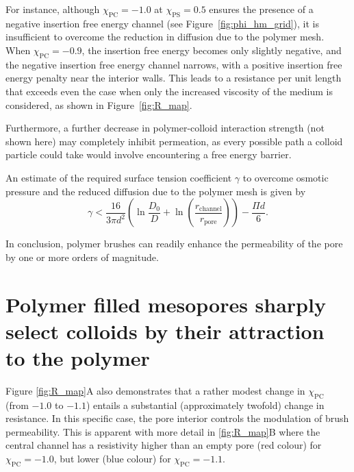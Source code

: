 \documentclass[12pt, a4paper]{article}
\begin{document}
For instance, although $\chi_{\textrm{PC}} = -1.0$ at $\chi_{\textrm{PS}} = 0.5$ ensures the presence of a negative insertion free energy channel (see Figure~\ref{fig:phi_hm_grid}), it is insufficient to overcome the reduction in diffusion due to the polymer mesh. 
When $\chi_{\textrm{PC}} = -0.9$, the insertion free energy becomes only slightly negative, and the negative insertion free energy channel narrows, with a positive insertion free energy penalty near the interior walls. 
This leads to a resistance per unit length that exceeds even the case when only the increased viscosity of the medium is considered, as shown in Figure~\ref{fig:R_map}.

Furthermore, a further decrease in polymer-colloid interaction strength (not shown here) may completely inhibit permeation, as every possible path a colloid particle could take would involve encountering a free energy barrier.

An estimate of the required surface tension coefficient $\gamma$ to overcome osmotic pressure and the reduced diffusion due to the polymer mesh is given by
\begin{equation}
\gamma < \frac{16}{3 \pi d^2} \left( \ln\frac{D_0}{D} + \ln\left( \frac{r_{\textrm{channel}}}{r_{\textrm{pore}}} \right) \right) - \frac{\Pi d}{6}.
\end{equation}

In conclusion, polymer brushes can readily enhance the permeability of the pore by one or more orders of magnitude.

\section{Polymer filled mesopores sharply select colloids by their attraction to the polymer}

Figure \ref{fig:R_map}A also demonstrates that a rather modest change in $\chi_{\text{PC}}$ (from $-1.0$ to $-1.1$) entails a substantial (approximately twofold) change in resistance. 
In this specific case, the pore interior controls the modulation of brush permeability. 
This is apparent with more detail in \ref{fig:R_map}B where the central channel has a resistivity higher than an empty pore (red colour) for $\chi_{\text{PC}}=-1.0$, 
but lower (blue colour) for $\chi_{\text{PC}}=-1.1$. 
\end{document}
